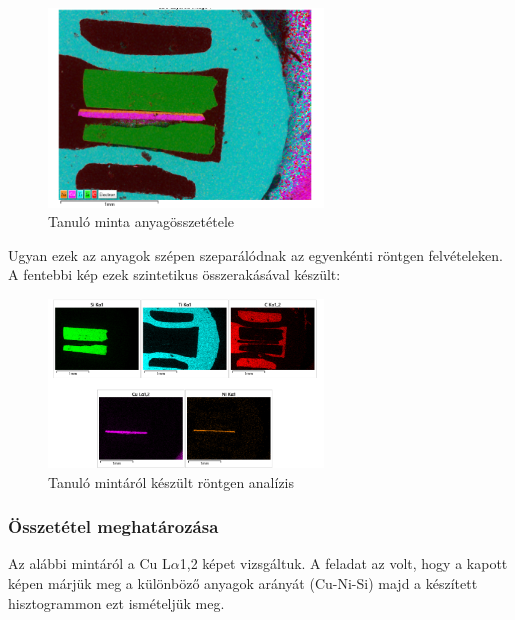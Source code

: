 \documentclass[a4paper,12pt]{article}
\begin{document}
\begin{figure}[H]
	\centering
	\includegraphics[width=0.65\textwidth, height=0.45\textwidth]{Jcsop/elsoanyag.png}
	\caption{Tanuló minta anyagösszetétele}
\end{figure}

\par Ugyan ezek az anyagok szépen szeparálódnak az egyenkénti röntgen felvételeken. A fentebbi kép ezek
szintetikus összerakásával készült:

\begin{figure}[H]
	\centering
	\includegraphics[width=0.65\textwidth, height=0.45\textwidth]{Jcsop/elsortg.png}
	\caption{Tanuló mintáról készült röntgen analízis}
\end{figure}

\subsubsection{ Összetétel meghatározása}

\par Az alábbi mintáról a Cu L$\alpha$1,2 képet vizsgáltuk. A feladat
az volt, hogy a kapott képen márjük meg a különböző anyagok arányát (Cu-Ni-Si)
majd a készített hisztogrammon ezt ismételjük meg.
\end{document}
